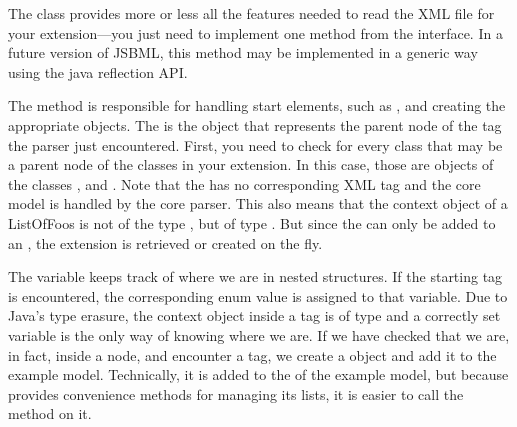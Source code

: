 The class  provides more or less all the 
features needed to read the XML file for your extension---you just need to implement one
method from the  interface. In a future version of JSBML, this method
may be implemented in a generic way using the java reflection API.

The  method is responsible for handling start
elements, such as , and creating the appropriate
objects.  The  is the object that represents the parent
node of the tag the parser just encountered.  First, you need to check for
every class that may be a parent node of the classes in your extension.  In
this case, those are objects of the classes \Model,  and
.  Note that the  has no corresponding XML
tag and the core model is handled by the core parser.  This also
means that the context object of a ListOfFoos is not of the type
, but of type \Model.  But since the 
can only be added to an , the extension is retrieved or
created on the fly.

The  variable keeps track of where we are in
nested structures.  If the  starting tag is encountered,
the corresponding enum value is assigned to that variable.  Due to Java's
type erasure, the context object inside a  tag is of type
 and a correctly set  variable is the only
way of knowing where we are.  If we have checked that we are, in fact,
inside a  node, and encounter a  tag, we create a
 object and add it to the example model.  Technically, it is
added to the  of the example model, but because
 provides convenience methods for managing its lists, it
is easier to call the  method on it.

